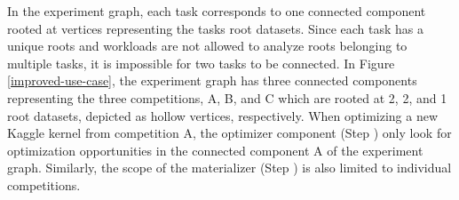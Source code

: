 In the experiment graph, each task corresponds to one connected component rooted at vertices representing the tasks root datasets.
Since each task has a unique roots and workloads are not allowed to analyze roots belonging to multiple tasks, it is impossible for two tasks to be connected.
In Figure \ref{improved-use-case}, the experiment graph has three connected components representing the three competitions, A, B, and C which are rooted at 2, 2, and 1 root datasets, depicted as hollow vertices, respectively.
When optimizing a new Kaggle kernel from competition A, the optimizer component (Step ) only look for optimization opportunities in the connected component A of the experiment graph.
Similarly, the scope of the materializer (Step ) is also limited to individual competitions.